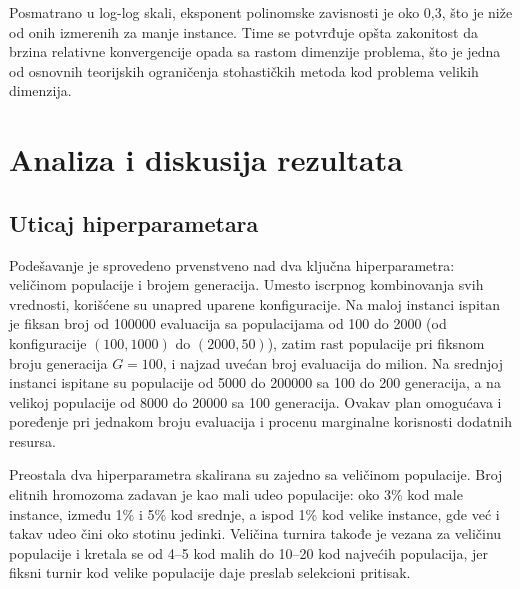 \documentclass[12pt]{article}
\begin{document}
Posmatrano u log-log skali, eksponent polinomske zavisnosti je oko 0,3, što je niže od onih izmerenih za manje instance. Time se potvrđuje opšta zakonitost da brzina relativne konvergencije opada sa rastom dimenzije problema, što je jedna od osnovnih teorijskih ograničenja stohastičkih metoda kod problema velikih dimenzija.

\pagebreak

\section{Analiza i diskusija rezultata}\label{sec:analiza}

\subsection{Uticaj hiperparametara}

Podešavanje je sprovedeno prvenstveno nad dva ključna hiperparametra: veličinom populacije i brojem generacija. Umesto iscrpnog kombinovanja svih vrednosti, korišćene su unapred uparene konfiguracije. Na maloj instanci ispitan je fiksan broj od 100000 evaluacija sa populacijama od 100 do 2000 (od konfiguracije $(100, 1000)$ do $(2000, 50)$), zatim rast populacije pri fiksnom broju generacija $G = 100$, i najzad uvećan broj evaluacija do milion. Na srednjoj instanci ispitane su populacije od 5000 do 200000 sa 100 do 200 generacija, a na velikoj populacije od 8000 do 20000 sa 100 generacija. Ovakav plan omogućava i poređenje pri jednakom broju evaluacija i procenu marginalne korisnosti dodatnih resursa.

Preostala dva hiperparametra skalirana su zajedno sa veličinom populacije. Broj elitnih hromozoma zadavan je kao mali udeo populacije: oko 3\% kod male instance, između 1\% i 5\% kod srednje, a ispod 1\% kod velike instance, gde već i takav udeo čini oko stotinu jedinki. Veličina turnira takođe je vezana za veličinu populacije i kretala se od 4--5 kod malih do 10--20 kod najvećih populacija, jer fiksni turnir kod velike populacije daje preslab selekcioni pritisak.
\end{document}
